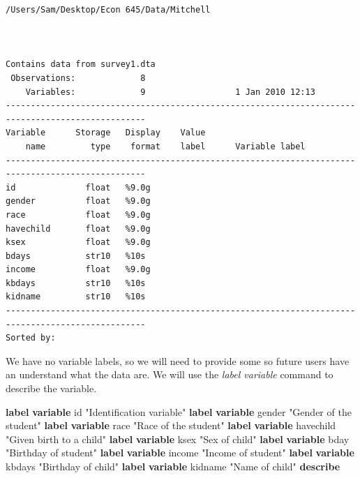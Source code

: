 \documentclass[
]{book}
\newenvironment{Shaded}{\begin{snugshade}}{\end{snugshade}}
\newcommand{\KeywordTok}[1]{\textcolor[rgb]{0.13,0.29,0.53}{\textbf{#1}}}
\newcommand{\NormalTok}[1]{#1}
\newcommand{\StringTok}[1]{\textcolor[rgb]{0.31,0.60,0.02}{#1}}
\begin{document}
\begin{verbatim}
/Users/Sam/Desktop/Econ 645/Data/Mitchell



Contains data from survey1.dta
 Observations:             8                  
    Variables:             9                  1 Jan 2010 12:13
--------------------------------------------------------------------------------------------------
Variable      Storage   Display    Value
    name         type    format    label      Variable label
--------------------------------------------------------------------------------------------------
id              float   %9.0g                 
gender          float   %9.0g                 
race            float   %9.0g                 
havechild       float   %9.0g                 
ksex            float   %9.0g                 
bdays           str10   %10s                  
income          float   %9.0g                 
kbdays          str10   %10s                  
kidname         str10   %10s                  
--------------------------------------------------------------------------------------------------
Sorted by: 
\end{verbatim}

We have no variable labels, so we will need to provide some so future users have an understand what the data are. We will use the \emph{label variable} command to describe the variable.

\begin{Shaded}
\begin{Highlighting}[]
\KeywordTok{label} \KeywordTok{variable}\NormalTok{ id }\StringTok{"Identification variable"}
\KeywordTok{label} \KeywordTok{variable}\NormalTok{ gender }\StringTok{"Gender of the student"}
\KeywordTok{label} \KeywordTok{variable}\NormalTok{ race }\StringTok{"Race of the student"}
\KeywordTok{label} \KeywordTok{variable}\NormalTok{ havechild }\StringTok{"Given birth to a child"}
\KeywordTok{label} \KeywordTok{variable}\NormalTok{ ksex }\StringTok{"Sex of child"}
\KeywordTok{label} \KeywordTok{variable}\NormalTok{ bday }\StringTok{"Birthday of student"}
\KeywordTok{label} \KeywordTok{variable}\NormalTok{ income }\StringTok{"Income of student"}
\KeywordTok{label} \KeywordTok{variable}\NormalTok{ kbdays }\StringTok{"Birthday of child"}
\KeywordTok{label} \KeywordTok{variable}\NormalTok{ kidname }\StringTok{"Name of child"}
\KeywordTok{describe}
\end{Highlighting}
\end{Shaded}
\end{document}
